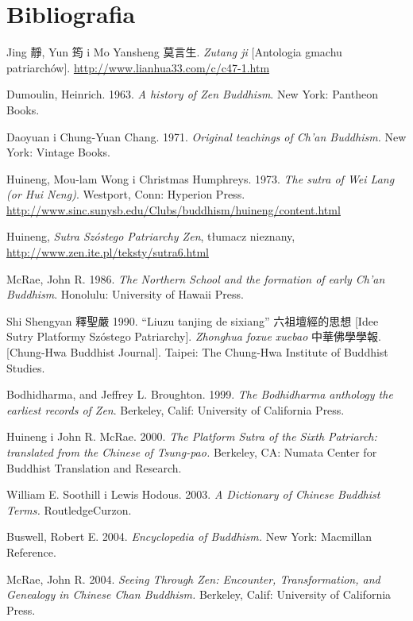 \onecolumn
\chapter*{Bibliografia}

Jing 靜, Yun 筠 i Mo Yansheng 莫言生. \textit{Zutang ji} [Antologia gmachu patriarchów]. \url{http://www.lianhua33.com/c/c47-1.htm}

Dumoulin, Heinrich. 1963. \textit{A history of Zen Buddhism}. New York: Pantheon Books.

Daoyuan i Chung-Yuan Chang. 1971. \textit{Original teachings of Ch'an Buddhism.} New York: Vintage Books. 

Huineng, Mou-lam Wong i Christmas Humphreys. 1973. \textit{The sutra of Wei Lang (or Hui Neng)}. Westport, Conn: Hyperion Press. \url{http://www.sinc.sunysb.edu/Clubs/buddhism/huineng/content.html}

Huineng, \textit{Sutra Szóstego Patriarchy Zen}, tłumacz nieznany, \url{http://www.zen.ite.pl/teksty/sutra6.html}

McRae, John R. 1986. \textit{The Northern School and the formation of early Ch'an Buddhism}. Honolulu: University of Hawaii Press.

Shi Shengyan 釋聖嚴 1990. ``Liuzu tanjing de sixiang'' 六祖壇經的思想 [Idee Sutry Platformy Szóstego Patriarchy]. \textit{Zhonghua foxue xuebao} 中華佛學學報. [Chung-Hwa Buddhist Journal]. Taipei: The Chung-Hwa Institute of Buddhist Studies.

Bodhidharma, and Jeffrey L. Broughton. 1999. \textit{The Bodhidharma anthology the earliest records of Zen}. Berkeley, Calif: University of California Press.

Huineng i John R. McRae. 2000. \textit{The Platform Sutra of the Sixth Patriarch: translated from the Chinese of Tsung-pao.} Berkeley, CA: Numata Center for Buddhist Translation and Research.

William E. Soothill i Lewis Hodous. 2003. \textit{A Dictionary of Chinese Buddhist Terms.} RoutledgeCurzon.%

Buswell, Robert E. 2004. \textit{Encyclopedia of Buddhism.} New York: Macmillan Reference.

McRae, John R. 2004. \textit{Seeing Through Zen: Encounter, Transformation, and Genealogy in Chinese Chan Buddhism.} Berkeley, Calif: University of California Press.

